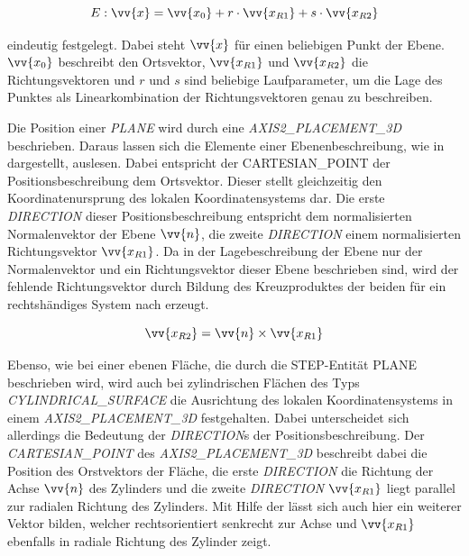 \begin{equation}\label{eq:plane}
E: \vv{x} = \vv{x_{0}} + r \cdot \vv{x_{R1}} + s \cdot \vv{x_{R2}}  
\end{equation}

eindeutig festgelegt. Dabei steht $\vv{x}$ für einen beliebigen Punkt der Ebene. $\vv{x_{0}}$ beschreibt den Ortsvektor, $\vv{x_{R1}}$ und $\vv{x_{R2}}$  die Richtungsvektoren und $r$ und $s$ sind beliebige Laufparameter, um die Lage des Punktes als Linearkombination der Richtungsvektoren genau zu beschreiben.

Die Position einer \textit{PLANE} wird durch eine \textit{AXIS2\_PLACEMENT\_3D} beschrieben. Daraus lassen sich die Elemente einer Ebenenbeschreibung, wie in  dargestellt, auslesen. 
Dabei entspricht der CARTESIAN\_POINT der Positionsbeschreibung dem Ortsvektor. Dieser stellt gleichzeitig den Koordinatenursprung des lokalen Koordinatensystems dar. Die erste \textit{DIRECTION} dieser Positionsbeschreibung entspricht dem normalisierten Normalenvektor der Ebene $\vv{n}$, die zweite \textit{DIRECTION} einem normalisierten Richtungsvektor $\vv{x_{R1}}$. Da in der Lagebeschreibung der Ebene nur der Normalenvektor und ein Richtungsvektor dieser Ebene beschrieben sind, wird der fehlende Richtungsvektor durch Bildung des Kreuzproduktes der beiden für ein rechtshändiges System nach  erzeugt.

\begin{equation}\label{eq:crossproduct}
\vv{x_{R2}} = \vv{n} \times \vv{x_{R1}}
\end{equation}  

Ebenso, wie bei einer ebenen Fläche, die durch die STEP-Entität PLANE beschrieben wird, wird auch bei zylindrischen Flächen des Typs \textit{CYLINDRICAL\_SURFACE} die Ausrichtung des lokalen Koordinatensystems in einem \textit{AXIS2\_PLACEMENT\_3D} festgehalten. Dabei unterscheidet sich allerdings die Bedeutung der \textit{DIRECTION}s der Positionsbeschreibung. Der \textit{CARTESIAN\_POINT} des \textit{AXIS2\_PLACEMENT\_3D} beschreibt dabei die Position des Orstvektors der Fläche, die erste \textit{DIRECTION} die Richtung der Achse $\vv{n}$ des Zylinders und die zweite \textit{DIRECTION} $\vv{x_{R1}}$ liegt parallel zur radialen Richtung des Zylinders. Mit Hilfe der  lässt sich auch hier ein weiterer Vektor bilden, welcher rechtsorientiert senkrecht zur Achse und $\vv{x_{R1}}$ ebenfalls in radiale Richtung des Zylinder zeigt. 

